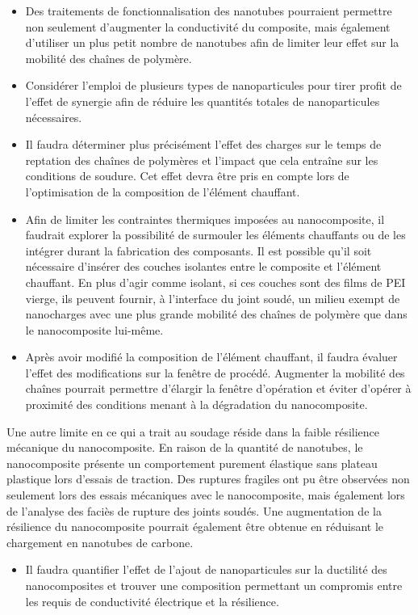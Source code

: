 \begin{itemize}
	\item Des traitements de fonctionnalisation des nanotubes pourraient permettre non seulement d'augmenter la conductivité du composite, mais également d'utiliser un plus petit nombre de nanotubes afin de limiter leur effet sur la mobilité des chaînes de polymère. 
	\item Considérer l'emploi de plusieurs types de nanoparticules pour tirer profit de l'effet de synergie afin de réduire les quantités totales de nanoparticules nécessaires. 
	\item Il faudra déterminer plus précisément l'effet des charges sur le temps de reptation des chaînes de polymères et l'impact que cela entraîne sur les conditions de soudure. 
	Cet effet devra être pris en compte lors de l'optimisation de la composition de l'élément chauffant. 
	\item Afin de limiter les contraintes thermiques imposées au nanocomposite, il faudrait explorer la possibilité de surmouler les éléments chauffants ou de les intégrer durant la fabrication des composants. 
	Il est possible qu'il soit nécessaire d'insérer des couches isolantes entre le composite et l'élément chauffant. 
	En plus d'agir comme isolant, si ces couches sont des films de PEI vierge, ils peuvent fournir, à l'interface du joint soudé, un milieu exempt de nanocharges avec une plus grande mobilité des chaînes de polymère que dans le nanocomposite lui-même. 
	\item Après avoir modifié la composition de l'élément chauffant, il faudra évaluer l'effet  des modifications sur la fenêtre de procédé. 
	Augmenter la mobilité des chaînes pourrait permettre d'élargir la fenêtre d'opération et éviter d'opérer à proximité des conditions menant à la dégradation du nanocomposite. 
\end{itemize}

Une autre limite en ce qui a trait au soudage réside dans la faible résilience mécanique du nanocomposite. 
En raison de la quantité de nanotubes, le nanocomposite présente un comportement purement élastique sans plateau plastique lors d'essais de traction. 
Des ruptures fragiles ont pu être observées non seulement lors des essais mécaniques avec le nanocomposite, mais également lors de l'analyse des faciès de rupture des joints soudés. 
Une augmentation de la résilience du nanocomposite pourrait également être obtenue en réduisant le chargement en nanotubes de carbone. 

\begin{itemize}
	\item Il faudra quantifier l'effet de l'ajout de nanoparticules sur la ductilité des nanocomposites et trouver une composition permettant un compromis entre les requis de conductivité électrique et la résilience. 
\end{itemize}

